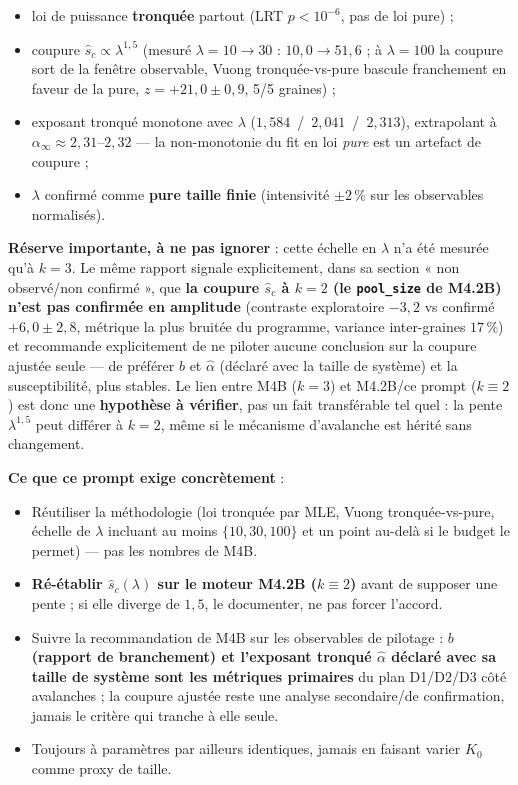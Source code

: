 \documentclass[11pt,a4paper]{article}
\newcommand{\code}[1]{\texttt{#1}}
\begin{document}
\begin{itemize}
\item loi de puissance \textbf{tronquée} partout (LRT $p<10^{-6}$, pas
  de loi pure) ;
\item coupure $\hat s_c \propto \lambda^{1{,}5}$ (mesuré
  $\lambda=10\to30$ : $10{,}0\to51{,}6$ ; à $\lambda=100$ la coupure
  sort de la fenêtre observable, Vuong tronquée-vs-pure bascule
  franchement en faveur de la pure, $z=+21{,}0\pm0{,}9$, 5/5 graines) ;
\item exposant tronqué monotone avec $\lambda$
  ($1{,}584$~/~$2{,}041$~/~$2{,}313$), extrapolant à
  $\alpha_\infty\approx2{,}31$--$2{,}32$ --- la non-monotonie du fit
  en loi \emph{pure} est un artefact de coupure ;
\item $\lambda$ confirmé comme \textbf{pure taille finie} (intensivité
  $\pm2\,\%$ sur les observables normalisés).
\end{itemize}

\textbf{Réserve importante, à ne pas ignorer} : cette échelle en
$\lambda$ n'a été mesurée qu'à $k=3$. Le même rapport signale
explicitement, dans sa section « non observé/non confirmé », que
\textbf{la coupure $\hat s_c$ à $k=2$ (le \code{pool\_size} de M4.2B)
n'est pas confirmée en amplitude} (contraste exploratoire $-3{,}2$ vs
confirmé $+6{,}0\pm2{,}8$, métrique la plus bruitée du programme,
variance inter-graines $17\,\%$) et recommande explicitement de ne
piloter aucune conclusion sur la coupure ajustée seule --- de
préférer $b$ et $\hat\alpha$ (déclaré avec la taille de système) et
la susceptibilité, plus stables. Le lien entre M4B ($k=3$) et
M4.2B/ce prompt ($k\equiv2$) est donc une \textbf{hypothèse à
vérifier}, pas un fait transférable tel quel : la pente
$\lambda^{1{,}5}$ peut différer à $k=2$, même si le mécanisme
d'avalanche est hérité sans changement.

\textbf{Ce que ce prompt exige concrètement} :

\begin{itemize}
\item Réutiliser la méthodologie (loi tronquée par MLE, Vuong
  tronquée-vs-pure, échelle de $\lambda$ incluant au moins
  $\{10, 30, 100\}$ et un point au-delà si le budget le permet) ---
  pas les nombres de M4B.
\item \textbf{Ré-établir $\hat s_c(\lambda)$ sur le moteur M4.2B
  ($k\equiv2$)} avant de supposer une pente ; si elle diverge de
  $1{,}5$, le documenter, ne pas forcer l'accord.
\item Suivre la recommandation de M4B sur les observables de
  pilotage : \textbf{$b$ (rapport de branchement) et l'exposant
  tronqué $\hat\alpha$ déclaré avec sa taille de système sont les
  métriques primaires} du plan D1/D2/D3 côté avalanches ; la coupure
  ajustée reste une analyse secondaire/de confirmation, jamais le
  critère qui tranche à elle seule.
\item Toujours à paramètres par ailleurs identiques, jamais en
  faisant varier $K_0$ comme proxy de taille.
\end{itemize}
\end{document}
